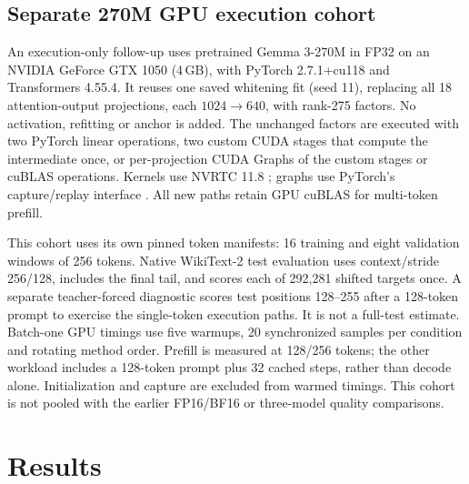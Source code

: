 \documentclass[conference]{IEEEtran}
\begin{document}
\subsection{Separate 270M GPU execution cohort}
An execution-only follow-up uses pretrained Gemma 3-270M in FP32 on an NVIDIA GeForce GTX 1050 (4\,GB), with PyTorch 2.7.1+cu118 and Transformers 4.55.4. It reuses one saved whitening fit (seed 11), replacing all 18 attention-output projections, each $1024\rightarrow640$, with rank-275 factors. No activation, refitting or anchor is added. The unchanged factors are executed with two PyTorch linear operations, two custom CUDA stages that compute the intermediate once, or per-projection CUDA Graphs of the custom stages or cuBLAS operations. Kernels use NVRTC 11.8 \cite{nvidia2022nvrtc}; graphs use PyTorch's capture/replay interface \cite{pytorch27graphs}. All new paths retain GPU cuBLAS for multi-token prefill.\par\smallskip
This cohort uses its own pinned token manifests: 16 training and eight validation windows of 256 tokens. Native WikiText-2 test evaluation uses context/stride 256/128, includes the final tail, and scores each of 292,281 shifted targets once. A separate teacher-forced diagnostic scores test positions 128--255 after a 128-token prompt to exercise the single-token execution paths. It is not a full-test estimate. Batch-one GPU timings use five warmups, 20 synchronized samples per condition and rotating method order. Prefill is measured at 128/256 tokens; the other workload includes a 128-token prompt plus 32 cached steps, rather than decode alone. Initialization and capture are excluded from warmed timings. This cohort is not pooled with the earlier FP16/BF16 or three-model quality comparisons.\par\smallskip
\section{Results}
\end{document}
